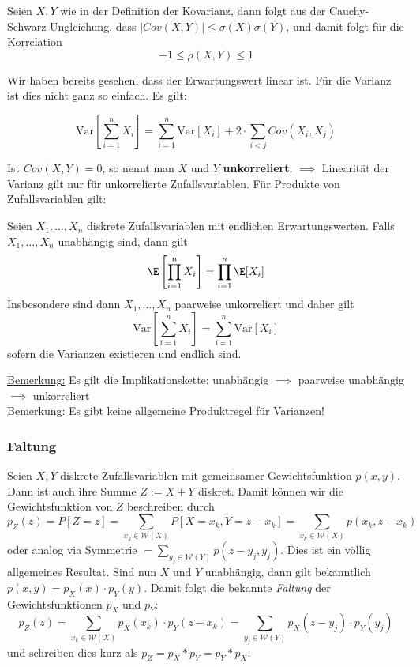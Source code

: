 \begin{satz}
Seien $X,Y$ wie in der Definition der Kovarianz, dann folgt aus der Cauchy-Schwarz Ungleichung, dass $|Cov(X,Y)| \leq \sigma(X)\sigma(Y)$, und damit folgt für die Korrelation
$$ -1 \leq \rho(X,Y) \leq 1$$
\end{satz}

Wir haben bereits gesehen, dass der Erwartungswert linear ist. Für die Varianz ist dies nicht ganz so einfach. Es gilt:

\begin{korollar}
$$ \mbox{Var}\left[\sum_{i=1}^n X_i \right] = \sum_{i=1}^n \mbox{Var}[X_i] + 2 \cdot \sum_{i < j} Cov(X_i, X_j)$$
\end{korollar}
Ist $Cov(X,Y) = 0$, so nennt man $X$ und $Y$ \textbf{unkorreliert}. $\implies$ Linearität der Varianz gilt nur für unkorrelierte Zufallsvariablen. Für Produkte von Zufallsvariablen gilt:

\begin{satz}
Seien $X_1,\dots, X_n$  diskrete Zufallsvariablen mit endlichen Erwartungswerten. Falls $X_1,\dots,X_n$ unabhängig sind, dann gilt
$$\E\left[\prod_{i=1}^n X_i\right] = \prod_{i=1}^n \E[X_i]$$ Insbesondere sind dann $X_1,\dots,X_n$ paarweise unkorreliert und daher gilt
$$ \mbox{Var}\left[\sum_{i=1}^n X_i\right] = \sum_{i=1}^n \mbox{Var}[X_i]$$ sofern die Varianzen existieren und endlich sind.
\end{satz}
\underline{Bemerkung:} Es gilt die Implikationskette: unabhängig $\implies$ paarweise unabhängig $\implies$ unkorreliert\\

\underline{Bemerkung:} Es gibt keine allgemeine Produktregel für Varianzen!

\subsubsection*{Faltung}
Seien $X,Y$ diskrete Zufallsvariablen mit gemeinsamer Gewichtsfunktion $p(x,y)$. Dann ist auch ihre Summe $Z:=X+Y$ diskret. Damit können wir die Gewichtsfunktion von $Z$ beschreiben durch
$$ p_Z(z) = P[Z=z] = \sum_{x_k \in \mathcal{W}(X)} P[X=x_k, Y = z-x_k] = \sum_{x_k \in \mathcal{W}(X)} p(x_k, z-x_k)$$ oder analog via Symmetrie $= \sum_{y_j\in\mathcal{W}(Y)} p(z-y_j, y_j)$. Dies ist ein völlig allgemeines Resultat. Sind nun $X$ und $Y$ unabhängig, dann gilt bekanntlich $p(x,y)= p_X(x) \cdot p_Y(y)$. Damit folgt die bekannte \textit{Faltung} der Gewichtsfunktionen $p_X$ und $p_Y$:
$$ p_Z(z) = \sum_{x_k \in \mathcal{W}(X)} p_X(x_k) \cdot p_Y(z-x_k) = \sum_{y_j \in \mathcal{W}(Y)} p_X(z-y_j) \cdot p_Y(y_j)$$ und schreiben dies kurz als $p_Z = p_X * p_Y = p_Y * p_X$.

